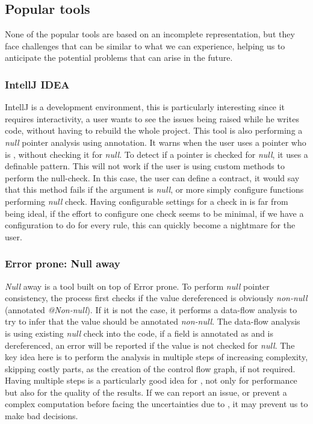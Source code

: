 \subsection{Popular tools}
\label{subsec:other_tools_features}

None of the popular tools are based on an incomplete representation, but they face challenges that can be similar to what we can experience, helping us to anticipate the potential problems that can arise in the future.

\subsubsection{IntellJ IDEA}
\label{subsubsec:intellj_idea}

IntellJ is a development environment, this is particularly interesting since it requires interactivity, a user wants to see the issues being raised while he writes code, without having to rebuild the whole project. 
This tool is also performing a \emph{null} pointer analysis using annotation. 
It warns when the user uses a pointer who is \nullable{}, without checking it for \emph{null}. 
To detect if a pointer is checked for \emph{null}, it uses a definable pattern. 
This will not work if the user is using custom methods to perform the null-check. 
In this case, the user can define a contract, it would say that this method fails if the argument is \emph{null}, or more simply configure functions performing \emph{null} check.\newline
Having configurable settings for a check in \slang{} is far from being ideal, if the effort to configure one check seems to be minimal, if we have a configuration to do for every rule, this can quickly become a nightmare for the user. 


\subsubsection{Error prone: Null away}
\label{subsubsec:error_prone}

\emph{Null} away is a tool built on top of Error prone. 
To perform \emph{null} pointer consistency, the process first checks if the value dereferenced is obviously \emph{non-null} (annotated \emph{@Non-null}). 
If it is not the case, it performs a data-flow analysis to try to infer that the value should be annotated \emph{non-null}. 
The data-flow analysis is using existing \emph{null} check into the code, if a field is annotated as \nullable{} and is dereferenced, an error will be reported if the value is not checked for \emph{null}. \newline
The key idea here is to perform the analysis in multiple steps of increasing complexity, skipping costly parts, as the creation of the control flow graph, if not required.
Having multiple steps is a particularly good idea for \slang{}, not only for performance but also for the quality of the results. 
If we can report an issue, or prevent a complex computation before facing the uncertainties due to \slang{}, it may prevent us to make bad decisions.

